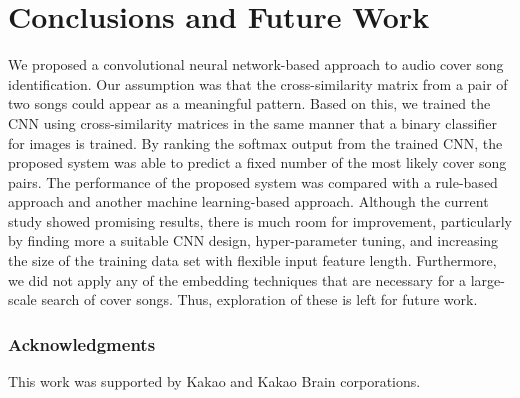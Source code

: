 \documentclass{article}
\begin{document}
\section{Conclusions and Future Work}
We proposed a convolutional neural network-based approach to audio cover song identification. Our assumption was that the cross-similarity matrix from a pair of two songs could appear as a meaningful pattern. Based on this, we trained the CNN using cross-similarity matrices in the same manner that a binary classifier for images is trained. By ranking the softmax output from the trained CNN, the proposed system was able to predict a fixed number of the most likely cover song pairs. The performance of the proposed system was compared with a rule-based approach and another machine learning-based approach. Although the current study showed promising results, there is much room for improvement, particularly by finding more a suitable CNN design, hyper-parameter tuning, and increasing the size of the training data set with flexible input feature length. Furthermore, we did not apply any of the embedding techniques that are necessary for a large-scale search of cover songs. Thus, exploration of these is left for future work.


\subsubsection*{Acknowledgments}
This work was supported by Kakao and Kakao Brain
corporations.


\end{document}
